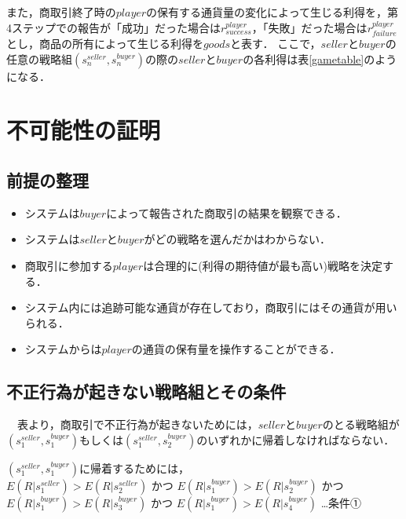 \documentclass[twocolumn, a4j]{article}
\begin{document}
また，商取引終了時の$ player$の保有する通貨量の変化によって生じる利得を，第4ステップでの報告が「成功」だった場合は$ r^{player}_{success}$，「失敗」だった場合は$ r^{player}_{failure}$とし，商品の所有によって生じる利得を$ goods$と表す．
ここで，$ seller$と$ buyer$の任意の戦略組$ (s^{seller}_n, s^{buyer}_n)$の際の$ seller$と$ buyer$の各利得は表\ref{gametable}のようになる．

\onecolumn
\section{不可能性の証明}
\subsection{前提の整理}
\begin{itemize}
  \item システムは$buyer$によって報告された商取引の結果を観察できる．
  \vspace{-12mm}
  \item システムは$seller$と$buyer$がどの戦略を選んだかはわからない．
  \vspace{-12mm}
	\item 商取引に参加する$player$は合理的に(利得の期待値が最も高い)戦略を決定する．
  \vspace{-12mm}
	\item システム内には追跡可能な通貨が存在しており，商取引にはその通貨が用いられる．
  \vspace{-12mm}
	\item システムからは$player$の通貨の保有量を操作することができる．
  \vspace{-12mm}
\end{itemize}

\subsection{不正行為が起きない戦略組とその条件}
　表より，商取引で不正行為が起きないためには，$seller$と$buyer$のとる戦略組が$ (s^{seller}_1, s^{buyer}_1)$もしくは$(s^{seller}_1, s^{buyer}_2)$のいずれかに帰着しなければならない．

$(s^{seller}_1, s^{buyer}_1)$に帰着するためには，\\

$E(R|s^{seller}_1)>E(R|s^{seller}_2)$
かつ
$E(R|s^{buyer}_1)>E(R|s^{buyer}_2)$
かつ
$E(R|s^{buyer}_1)>E(R|s^{buyer}_3)$
かつ
$E(R|s^{buyer}_1)>E(R|s^{buyer}_4)$ …条件①\\
\end{document}

